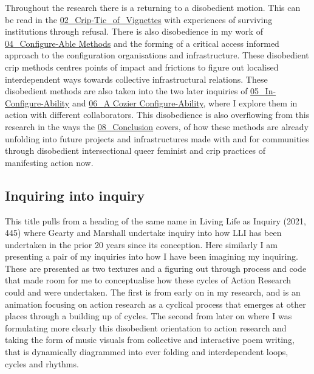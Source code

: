 Throughout the research there is a returning to a disobedient motion.
This can be read in the
\href{../../02_Crip-Tic_of_Vignettes/02_Crip-Tic_of_Vignettes.md}{02\_Crip-Tic\_of\_Vignettes}
with experiences of surviving institutions through refusal. There is
also disobedience in my work of
\href{../../04_Configure-able_Methods/04_Configure-Able\%20Methods.md}{04\_Configure-Able
Methods} and the forming of a critical access informed approach to the
configuration organisations and infrastructure. These disobedient crip
methods centres points of impact and frictions to figure out localised
interdependent ways towards collective infrastructural relations. These
disobedient methods are also taken into the two later inquiries of
\href{../../05_In-Configure-Ability/05_In-Configure-Ability.md}{05\_In-Configure-Ability}
and
\href{../../06_A\%20Cozier\%20Configure-Ability/06_A\%20Cozier\%20Configure-Ability.md}{06\_A
Cozier Configure-Ability}, where I explore them in action with different
collaborators. This disobedience is also overflowing from this research
in the ways the
\href{../../08_Conclusion/08_Conclusion.md}{08\_Conclusion} covers, of
how these methods are already unfolding into future projects and
infrastructures made with and for communities through disobedient
intersectional queer feminist and crip practices of manifesting action
now.

\hypertarget{inquiring-into-inquiry}{%
\subsection{Inquiring into inquiry}\label{inquiring-into-inquiry}}

This title pulls from a heading of the same name in Living Life as
Inquiry (2021, 445) where Gearty and Marshall undertake inquiry into how
LLI has been undertaken in the prior 20 years since its conception. Here
similarly I am presenting a pair of my inquiries into how I have been
imagining my inquiring. These are presented as two textures and a
figuring out through process and code that made room for me to
conceptualise how these cycles of Action Research could and were
undertaken. The first is from early on in my research, and is an
animation focusing on action research as a cyclical process that emerges
at other places through a building up of cycles. The second from later
on where I was formulating more clearly this disobedient orientation to
action research and taking the form of music visuals from collective and
interactive poem writing, that is dynamically diagrammed into ever
folding and interdependent loops, cycles and rhythms.

